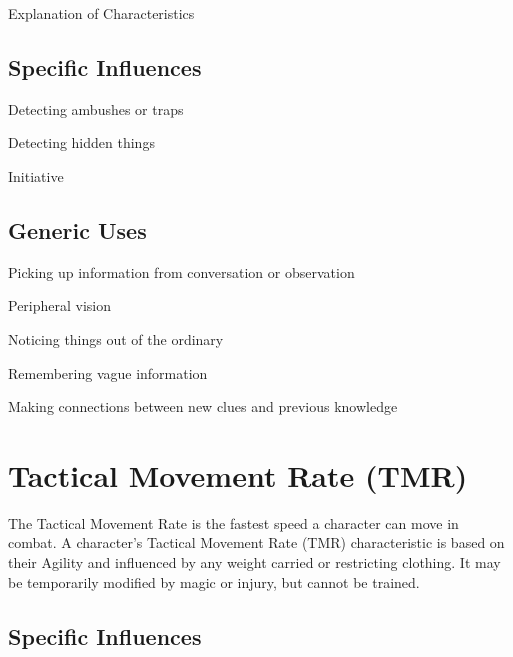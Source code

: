 \begin{Chapter}{Explanation of Characteristics}
\subsection{Specific Influences}

\begin{Itemize}

\item Detecting ambushes or traps

\item Detecting hidden things

\item Initiative 

\end{Itemize}

\subsection{Generic Uses}

\begin{Itemize}

\item Picking up information from conversation or observation

\item Peripheral vision

\item Noticing things out of the ordinary

\item Remembering vague information

\item Making connections between new clues and previous knowledge

\end{Itemize}


\section{Tactical Movement Rate (TMR)}

The Tactical Movement Rate is the fastest speed a character can move
in combat. A character’s Tactical Movement Rate (TMR) characteristic
is based on their Agility and influenced by any weight carried or
restricting clothing. It may be temporarily modified by magic or
injury, but cannot be trained.

\subsection{Specific Influences}


\end{Chapter}
